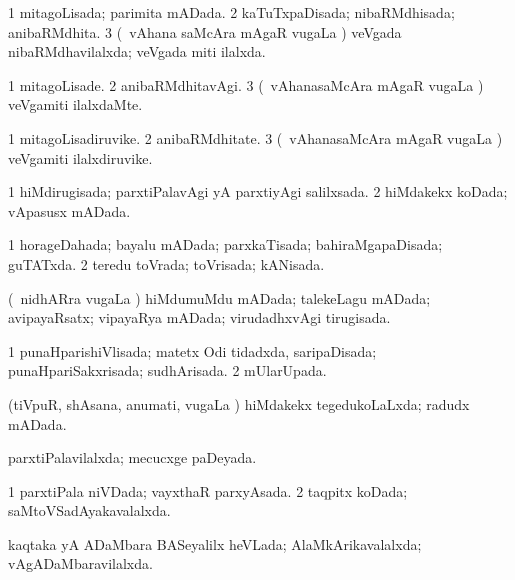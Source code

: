 \bentry
{} 
\gl{\gu}
\expl{}
\bmng
\bnum
\num{1} mitagoLisada; parimita mADada. 
\num{2} kaTuTxpaDisada; nibaRMdhisada; anibaRMdhita. 
\num{3} (\kanmu\ vAhana saMcAra mAgaR \mo vugaLa \vi) veVgada nibaRMdhavilalxda; veVgada miti ilalxda. 
\enum
\emng
\eentry

\bentry
{} 
\gl{\kirxvi}
\expl{}
\bmng
\bnum
\num{1} mitagoLisade. 
\num{2} anibaRMdhitavAgi. 
\num{3} (\kanmu\ vAhanasaMcAra mAgaR \mo vugaLa \vi) veVgamiti ilalxdaMte. 
\enum
\emng
\eentry

\bentry
{} 
\gl{\nA}
\expl{}
\bmng
\bnum
\num{1} mitagoLisadiruvike. 
\num{2} anibaRMdhitate. 
\num{3} (\kanmu\ vAhanasaMcAra mAgaR \mo vugaLa \vi) veVgamiti ilalxdiruvike. 
\enum
\emng
\eentry

\bentry
{} 
\gl{\gu}
\expl{}
\bmng
\bnum
\num{1} hiMdirugisada; parxtiPalavAgi yA parxtiyAgi salilxsada. 
\num{2} hiMdakekx koDada; vApasusx mADada. 
\enum
\emng
\eentry

\bentry
{} 
\gl{\gu}
\expl{}
\bmng
\bnum
\num{1} horageDahada; bayalu mADada; parxkaTisada; bahiraMgapaDisada; guTATxda. 
\num{2} teredu toVrada; toVrisada; kANisada. 
\enum
\emng
\eentry

\bentry
{} 
\gl{\gu}
\expl{}
\bmng
(\kanmu\ nidhARra \mo vugaLa \vi) hiMdumuMdu mADada; talekeLagu mADada; avipayaRsatx; vipayaRya mADada; virudadhxvAgi tirugisada. 
\emng
\eentry

\bentry
{} 
\gl{\gu}
\expl{}
\bmng
\bnum
\num{1} punaHparishiVlisada; matetx Odi tidadxda, saripaDisada; punaHpariSakxrisada; sudhArisada. 
\num{2} mUlarUpada. 
\enum
\emng
\eentry

\bentry
{} 
\gl{\gu}
\expl{}
\bmng
(tiVpuR, shAsana, anumati, \mo vugaLa \vi) hiMdakekx tegedukoLaLxda; radudx mADada. 
\emng
\eentry

\bentry
{} 
\gl{\gu}
\expl{}
\bmng
parxtiPalavilalxda; mecucxge paDeyada. 
\emng
\eentry

\bentry
{} 
\gl{\gu} 
\bmng
\bnum
\num{1} parxtiPala niVDada; vayxthaR parxyAsada. 
\num{2} taqpitx koDada; saMtoVSadAyakavalalxda. 
\enum
\emng
\eentry

\bentry
{} 
\gl{\gu}
\expl{}
\bmng
kaqtaka yA ADaMbara BASeyalilx heVLada; AlaMkArikavalalxda; vAgADaMbaravilalxda. 
\emng
\eentry

